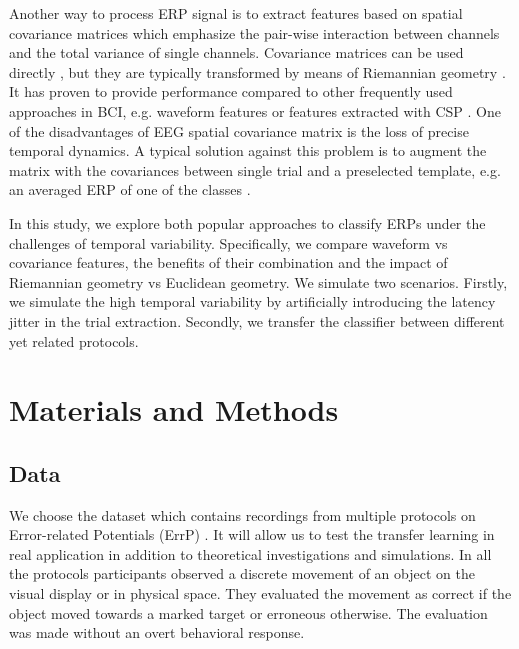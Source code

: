 \documentclass[12pt]{iopart}
\begin{document}
Another way to process ERP signal is to extract features based on spatial covariance matrices
which emphasize the pair-wise interaction
between channels and the total variance of single channels.
Covariance matrices can be used directly \cite{tomioka_classifying_2007}, but
they are typically transformed by means of Riemannian geometry 
\cite{barachant_classification_2013, zanini_transfer_2018}.
It has proven to provide performance compared to other frequently used
approaches in BCI, e.g. waveform features or 
features extracted with CSP \cite{blankertz_optimizing_2008}.
One of the disadvantages of
EEG spatial covariance matrix is the loss of precise temporal dynamics.
A typical solution against this problem is to augment the matrix
with the covariances between single trial and a preselected template,
e.g. an averaged ERP of one of the classes \cite{congedo_new_2013,barachant_plug&play_2014}.

In this study, we explore both popular approaches to classify ERPs
under the challenges of temporal variability. 
Specifically, we compare waveform vs covariance features,
the benefits of their combination and the impact of Riemannian geometry vs Euclidean geometry.
We simulate two scenarios. Firstly, we simulate the high temporal
variability by artificially introducing the latency jitter in the 
trial extraction. Secondly, we transfer the classifier between
different yet related protocols.







\section{Materials and Methods}
\label{sec:methods}
\subsection{Data}
We choose the dataset which contains recordings from multiple protocols
on Error-related Potentials (ErrP) \cite{iturrate_latency_2014-1}. It will allow us to test
the transfer learning in real application in addition to theoretical
investigations and simulations.
In all the protocols participants observed a discrete movement of an object
on the visual display or in physical space.
They evaluated the movement as correct if the object moved towards a marked target or erroneous 
otherwise. The evaluation was made without an overt behavioral response.
\end{document}
